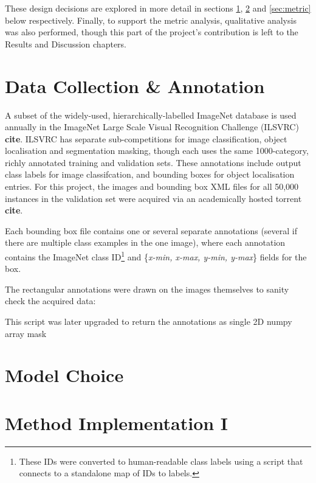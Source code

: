 \documentclass[main]{subfiles}
\begin{document}
These design decisions are explored in more detail in sections \ref{sec:data}, \ref{sec:model} and \ref{sec:metric} below respectively. Finally, to support the metric analysis, qualitative analysis was also performed, though this part of the project's contribution is left to the Results and Discussion chapters.


\section{Data Collection \& Annotation} \label{sec:data}

A subset of the widely-used, hierarchically-labelled ImageNet database is used annually in the ImageNet Large Scale Visual Recognition Challenge (ILSVRC) \textbf{cite}. ILSVRC has separate sub-competitions for image classification, object localisation and segmentation masking, though each uses the same 1000-category, richly annotated training and validation sets. These annotations include output class labels for image classifcation, and bounding boxes for object localisation entries. For this project, the images and bounding box XML files for all 50,000 instances in the validation set were acquired via an academically hosted torrent \textbf{cite}.

Each bounding box file contains one or several separate annotations (several if there are multiple class examples in the one image), where each annotation contains the ImageNet class ID\footnote{These IDs were converted to human-readable class labels using a script that connects to a standalone map of IDs to labels.} and \{\textit{x-min, x-max, y-min, y-max}\} fields for the box.

The rectangular annotations were drawn on the images themselves to sanity check the acquired data:


This script was later upgraded to return the annotations as single 2D numpy array mask




\newpage
\section{Model Choice} \label{sec:model}

\newpage
\section{Method Implementation I}
\end{document}
